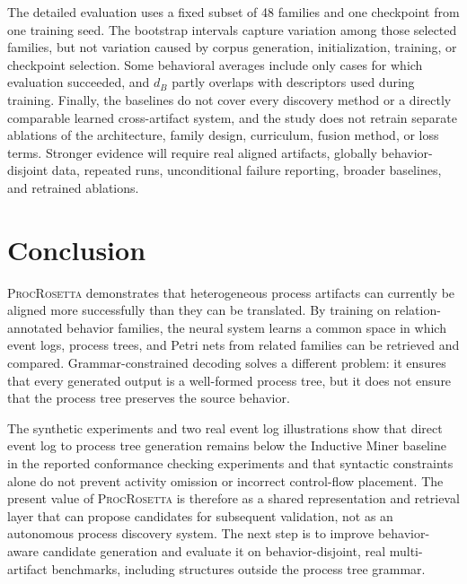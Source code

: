 \documentclass[mathematics,article,submit,moreauthors]{Definitions/mdpi}
\newcommand{\model}{\textsc{ProcRosetta}\xspace}
\begin{document}
The detailed evaluation uses a fixed subset of 48 families and one checkpoint from one training seed. The bootstrap intervals capture variation among those selected families, but not variation caused by corpus generation, initialization, training, or checkpoint selection. Some behavioral averages include only cases for which evaluation succeeded, and $d_B$ partly overlaps with descriptors used during training. Finally, the baselines do not cover every discovery method or a directly comparable learned cross-artifact system, and the study does not retrain separate ablations of the architecture, family design, curriculum, fusion method, or loss terms. Stronger evidence will require real aligned artifacts, globally behavior-disjoint data, repeated runs, unconditional failure reporting, broader baselines, and retrained ablations.

\FloatBarrier
\section{Conclusion}\label{sec:conclusion}

\model demonstrates that heterogeneous process artifacts can currently be aligned more successfully than they can be translated. By training on relation-annotated behavior families, the neural system learns a common space in which event logs, process trees, and Petri nets from related families can be retrieved and compared. Grammar-constrained decoding solves a different problem: it ensures that every generated output is a well-formed process tree, but it does not ensure that the process tree preserves the source behavior.

The synthetic experiments and two real event log illustrations show that direct event log to process tree generation remains below the Inductive Miner baseline in the reported conformance checking experiments and that syntactic constraints alone do not prevent activity omission or incorrect control-flow placement. The present value of \model is therefore as a shared representation and retrieval layer that can propose candidates for subsequent validation, not as an autonomous process discovery system. The next step is to improve behavior-aware candidate generation and evaluate it on behavior-disjoint, real multi-artifact benchmarks, including structures outside the process tree grammar.

\FloatBarrier

\end{document}
